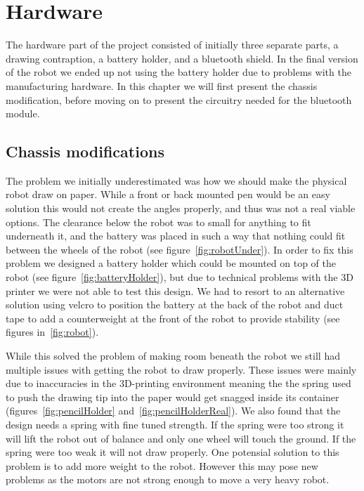 \section{Hardware}\label{ch:hardware}
The hardware part of the project consisted of initially three separate parts, a drawing contraption, a battery holder, and a bluetooth shield. 
In the final version of the robot we ended up not using the battery holder due to problems with the manufacturing hardware. 
In this chapter we will first present the chassis modification, before moving on to present the circuitry needed for the bluetooth module. 

\subsection*{Chassis modifications}
The problem we initially underestimated was how we should make the physical robot draw on paper. While a front or back mounted pen would be an easy solution this would not create the angles properly, and thus was not a real viable options. The clearance below the robot was to small for anything to fit underneath it, and the battery was placed in such a way that nothing could fit between the wheels of the robot (see figure~\ref{fig:robotUnder}). In order to fix this problem we designed a battery holder which could be mounted on top of the robot (see figure~\ref{fig:batteryHolder}), but due to technical problems with the 3D printer we were not able to test this design. We had to resort to an alternative solution using velcro to position the battery at the back of the robot and duct tape to add a counterweight at the front of the robot to provide stability (see figures in~\ref{fig:robot}). 

\bigskip\noindent
While this solved the problem of making room beneath the robot we still had multiple issues with getting the robot to draw properly. These issues were mainly due to inaccuracies in the 3D-printing environment meaning the the spring used to push the drawing tip into the paper would get snagged inside its container (figures~\ref{fig:pencilHolder} and~\ref{fig:pencilHolderReal}). 
We also found that the design needs a spring with fine tuned strength. If the spring were too strong it will lift the robot out of balance and only one wheel will touch the ground. If the spring were too weak it will not draw properly. One potensial solution to this problem is to add more weight to the robot. However this may pose new problems as the motors are not strong enough to move a very heavy robot.


